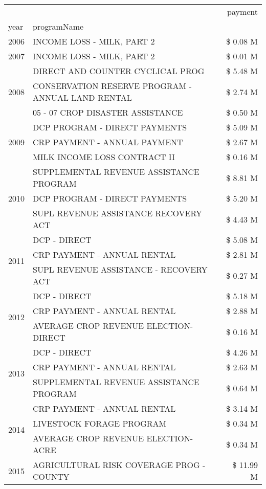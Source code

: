 \begin{tabular}{llr}
\toprule
 &  & payment \\
year & programName &  \\
\midrule
2006 & INCOME LOSS - MILK, PART 2 & \$ 0.08 M \\
\cline{1-3}
2007 & INCOME LOSS - MILK, PART 2 & \$ 0.01 M \\
\cline{1-3}
\multirow[t]{3}{*}{2008} & DIRECT AND COUNTER CYCLICAL PROG & \$ 5.48 M \\
 & CONSERVATION RESERVE PROGRAM - ANNUAL LAND RENTAL & \$ 2.74 M \\
 & 05 - 07 CROP DISASTER ASSISTANCE & \$ 0.50 M \\
\cline{1-3}
\multirow[t]{3}{*}{2009} & DCP PROGRAM - DIRECT PAYMENTS & \$ 5.09 M \\
 & CRP PAYMENT - ANNUAL PAYMENT & \$ 2.67 M \\
 & MILK INCOME LOSS CONTRACT II & \$ 0.16 M \\
\cline{1-3}
\multirow[t]{3}{*}{2010} & SUPPLEMENTAL REVENUE ASSISTANCE PROGRAM & \$ 8.81 M \\
 & DCP PROGRAM - DIRECT PAYMENTS & \$ 5.20 M \\
 & SUPL REVENUE ASSISTANCE RECOVERY ACT & \$ 4.43 M \\
\cline{1-3}
\multirow[t]{3}{*}{2011} & DCP - DIRECT & \$ 5.08 M \\
 & CRP PAYMENT - ANNUAL RENTAL & \$ 2.81 M \\
 & SUPL REVENUE ASSISTANCE - RECOVERY ACT & \$ 0.27 M \\
\cline{1-3}
\multirow[t]{3}{*}{2012} & DCP - DIRECT & \$ 5.18 M \\
 & CRP PAYMENT - ANNUAL RENTAL & \$ 2.88 M \\
 & AVERAGE CROP REVENUE ELECTION-DIRECT & \$ 0.16 M \\
\cline{1-3}
\multirow[t]{3}{*}{2013} & DCP - DIRECT & \$ 4.26 M \\
 & CRP PAYMENT - ANNUAL RENTAL & \$ 2.63 M \\
 & SUPPLEMENTAL REVENUE ASSISTANCE PROGRAM & \$ 0.64 M \\
\cline{1-3}
\multirow[t]{3}{*}{2014} & CRP PAYMENT - ANNUAL RENTAL & \$ 3.14 M \\
 & LIVESTOCK FORAGE PROGRAM & \$ 0.34 M \\
 & AVERAGE CROP REVENUE ELECTION-ACRE & \$ 0.34 M \\
\cline{1-3}
\multirow[t]{3}{*}{2015} & AGRICULTURAL RISK COVERAGE PROG - COUNTY & \$ 11.99 M \\

\end{tabular}
